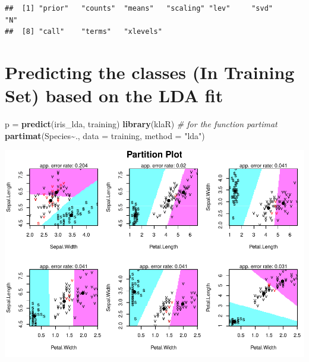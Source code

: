 \documentclass[
]{article}
\newenvironment{Shaded}{\begin{snugshade}}{\end{snugshade}}
\newcommand{\AttributeTok}[1]{\textcolor[rgb]{0.13,0.29,0.53}{#1}}
\newcommand{\CommentTok}[1]{\textcolor[rgb]{0.56,0.35,0.01}{\textit{#1}}}
\newcommand{\DocumentationTok}[1]{\textcolor[rgb]{0.56,0.35,0.01}{\textbf{\textit{#1}}}}
\newcommand{\FunctionTok}[1]{\textcolor[rgb]{0.13,0.29,0.53}{\textbf{#1}}}
\newcommand{\NormalTok}[1]{#1}
\newcommand{\OtherTok}[1]{\textcolor[rgb]{0.56,0.35,0.01}{#1}}
\newcommand{\SpecialCharTok}[1]{\textcolor[rgb]{0.81,0.36,0.00}{\textbf{#1}}}
\newcommand{\StringTok}[1]{\textcolor[rgb]{0.31,0.60,0.02}{#1}}
\begin{document}
\begin{verbatim}
##  [1] "prior"   "counts"  "means"   "scaling" "lev"     "svd"     "N"      
##  [8] "call"    "terms"   "xlevels"
\end{verbatim}

\hypertarget{predicting-the-classes-in-training-set-based-on-the-lda-fit}{%
\section{Predicting the classes (In Training Set) based on the LDA
fit}\label{predicting-the-classes-in-training-set-based-on-the-lda-fit}}

\begin{Shaded}
\begin{Highlighting}[]
\NormalTok{p }\OtherTok{=} \FunctionTok{predict}\NormalTok{(iris\_lda, training)}
\FunctionTok{library}\NormalTok{(klaR) }\CommentTok{\# for the function \textasciigrave{}partimat\textquotesingle{}}
\FunctionTok{partimat}\NormalTok{(Species}\SpecialCharTok{\textasciitilde{}}\NormalTok{., }\AttributeTok{data =}\NormalTok{ training, }\AttributeTok{method =} \StringTok{"lda"}\NormalTok{)}
\end{Highlighting}
\end{Shaded}

\includegraphics{LDA_QDA_IRIS_files/figure-latex/unnamed-chunk-4-1.pdf}

\begin{Shaded}
\end{Shaded}
\end{document}
